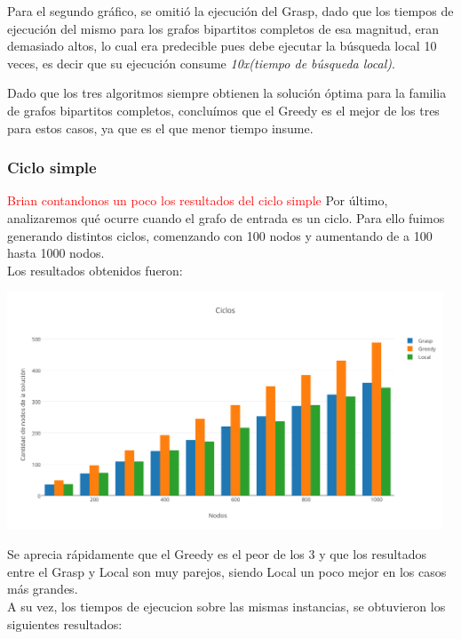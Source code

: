 Para el segundo gráfico, se omitió la ejecución del Grasp, dado que los tiempos de ejecución del mismo para los grafos bipartitos completos de esa magnitud, eran demasiado altos, 
lo cual era predecible pues debe ejecutar la b\'usqueda local 10 veces, es decir que su ejecuci\'on consume \textit{10x(tiempo de b\'usqueda local)}.


Dado que los tres algoritmos siempre obtienen la solución óptima para la familia de grafos bipartitos completos, concluímos que el Greedy es el mejor de los tres para estos casos, ya que es el que menor tiempo insume. 

\subsubsection{Ciclo simple}

\textcolor{red}{Brian contandonos un poco los resultados del ciclo simple}
Por \'ultimo, analizaremos qu\'e ocurre cuando el grafo de entrada es un ciclo. Para ello fuimos generando distintos ciclos, comenzando con 100 nodos y aumentando de a 100 hasta 1000 nodos.\\
Los resultados obtenidos fueron:\\

\begin{center}
 \includegraphics[width=13cm, keepaspectratio=yes]{imagenes/6/Ciclos.png}
\end{center}

Se aprecia r\'apidamente que el Greedy es el peor de los 3 y que los resultados entre el Grasp y Local son muy parejos, siendo Local un poco mejor en los casos m\'as grandes.\\

A su vez, los tiempos de ejecucion sobre las mismas instancias, se obtuvieron los siguientes resultados:

